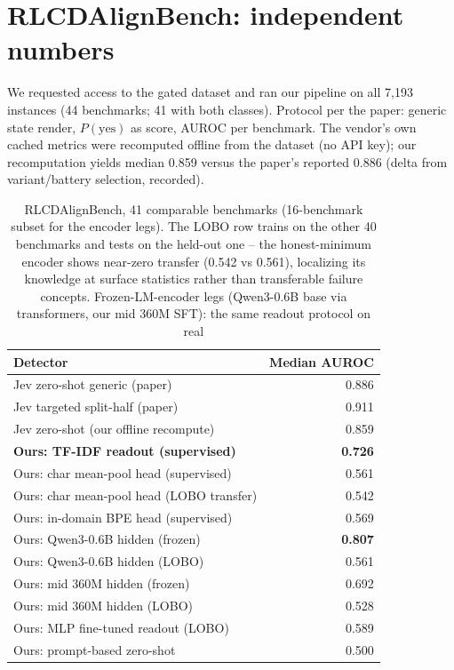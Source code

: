 \documentclass[11pt]{article}
\begin{document}
\section{RLCDAlignBench: independent numbers}
\label{sec:alignbench}

We requested access to the gated dataset and ran our pipeline on all
7,193 instances (44 benchmarks; 41 with both classes). Protocol per the
paper: generic state render, $P(\text{yes})$ as score, AUROC per
benchmark. The vendor's own cached metrics were recomputed offline from
the dataset (no API key); our recomputation yields median 0.859 versus
the paper's reported 0.886 (delta from variant/battery selection,
recorded).

\begin{table}[h]
\centering\small
\begin{tabular}{@{}lr@{}}
\toprule
Detector & Median AUROC \\
\midrule
Jev zero-shot generic (paper) & 0.886 \\
Jev targeted split-half (paper) & 0.911 \\
Jev zero-shot (our offline recompute) & 0.859 \\
\textbf{Ours: TF-IDF readout (supervised)} & \textbf{0.726} \\
Ours: char mean-pool head (supervised) & 0.561 \\
Ours: char mean-pool head (LOBO transfer) & 0.542 \\
Ours: in-domain BPE head (supervised) & 0.569 \\
Ours: Qwen3-0.6B hidden (frozen) & \textbf{0.807} \\
Ours: Qwen3-0.6B hidden (LOBO) & 0.561 \\
Ours: mid 360M hidden (frozen) & 0.692 \\
Ours: mid 360M hidden (LOBO) & 0.528 \\
Ours: MLP fine-tuned readout (LOBO) & 0.589 \\
Ours: prompt-based zero-shot & 0.500 \\
\bottomrule
\end{tabular}
\caption{RLCDAlignBench, 41 comparable benchmarks (16-benchmark
subset for the encoder legs). The LOBO row trains on the other 40
benchmarks and tests on the held-out one -- the honest-minimum encoder
shows near-zero transfer (0.542 vs 0.561), localizing its knowledge at
surface statistics rather than transferable failure concepts. Frozen-LM-encoder legs (Qwen3-0.6B base
via transformers, our mid 360M SFT): the same readout protocol on real
}
\end{table}
\end{document}
